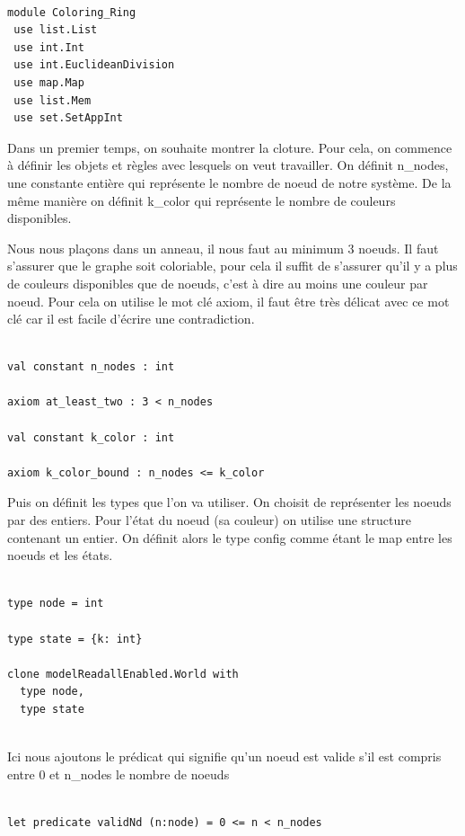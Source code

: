 \documentclass[11pt]{article}
\begin{document}
\lstset{language=why3,label= ,caption= ,captionpos=b,numbers=none}
\begin{lstlisting}

module Coloring_Ring
 use list.List
 use int.Int
 use int.EuclideanDivision
 use map.Map
 use list.Mem
 use set.SetAppInt

\end{lstlisting}

Dans un premier temps, on souhaite montrer la cloture.
Pour cela, on commence à définir les objets et règles avec lesquels on veut travailler. 
On définit n\_nodes, une constante entière qui représente le nombre de noeud de notre système. 
De la même manière on définit k\_color qui représente le nombre de couleurs disponibles.

Nous nous plaçons dans un anneau, il nous faut au minimum 3 noeuds. 
Il faut s'assurer que le graphe soit coloriable, pour cela il suffit de s'assurer qu'il y a plus de couleurs disponibles que de noeuds, c'est à dire au moins une couleur par noeud. 
Pour cela on utilise le mot clé axiom, il faut être très délicat avec ce mot clé car il est facile d'écrire une contradiction. 

\lstset{language=why3,label= ,caption= ,captionpos=b,numbers=none}
\begin{lstlisting}

val constant n_nodes : int

axiom at_least_two : 3 < n_nodes

val constant k_color : int

axiom k_color_bound : n_nodes <= k_color

\end{lstlisting}
Puis on définit les types que l'on va utiliser. 
On choisit de représenter les noeuds par des entiers.
Pour l'état du noeud (sa couleur) on utilise une structure contenant un entier.
On définit alors le type config comme étant le map entre les noeuds et les états.


\lstset{language=why3,label= ,caption= ,captionpos=b,numbers=none}
\begin{lstlisting}

type node = int

type state = {k: int}

clone modelReadallEnabled.World with
  type node,
  type state


\end{lstlisting}
Ici nous ajoutons le prédicat qui signifie qu'un noeud est valide s'il est compris entre 0 et n\_nodes le nombre de noeuds
\lstset{language=why3,label= ,caption= ,captionpos=b,numbers=none}
\begin{lstlisting}

let predicate validNd (n:node) = 0 <= n < n_nodes

\end{lstlisting}
\end{document}
